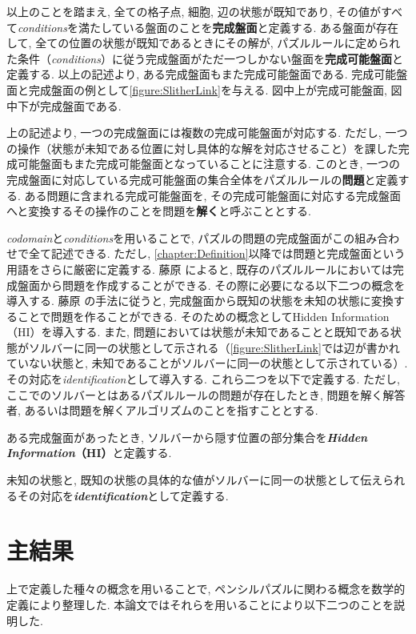 以上のことを踏まえ, 全ての格子点, 細胞, 辺の状態が既知であり, その値がすべて\textit{conditions}を満たしている盤面のことを\textbf{完成盤面}と定義する. ある盤面が存在して, 全ての位置の状態が既知であるときにその解が, パズルルールに定められた条件（\textit{conditions}）に従う完成盤面がただ一つしかない盤面を\textbf{完成可能盤面}と定義する. 以上の記述より, ある完成盤面もまた完成可能盤面である. 完成可能盤面と完成盤面の例として\cref{figure:SlitherLink}を与える. 図中上が完成可能盤面, 図中下が完成盤面である.

上の記述より, 一つの完成盤面には複数の完成可能盤面が対応する. ただし, 一つの操作（状態が未知である位置に対し具体的な解を対応させること）を課した完成可能盤面もまた完成可能盤面となっていることに注意する. このとき, 一つの完成盤面に対応している完成可能盤面の集合全体をパズルルールの\textbf{問題}と定義する. ある問題に含まれる完成可能盤面を, その完成可能盤面に対応する完成盤面へと変換するその操作のことを問題を\textbf{解く}と呼ぶこととする.

\textit{codomain}と\textit{conditions}を用いることで, パズルの問題の完成盤面がこの組み合わせで全て記述できる. ただし, \cref{chapter:Definition}以降では問題と完成盤面という用語をさらに厳密に定義する. 藤原 \cite{Fujiwara2022}によると, 既存のパズルルールにおいては完成盤面から問題を作成することができる. その際に必要になる以下二つの概念を導入する. 藤原 \cite{Fujiwara2022}の手法に従うと, 完成盤面から既知の状態を未知の状態に変換することで問題を作ることができる. そのための概念としてHidden Information（HI）を導入する. また, 問題においては状態が未知であることと既知である状態がソルバーに同一の状態として示される（\cref{figure:SlitherLink}では辺が書かれていない状態と, 未知であることがソルバーに同一の状態として示されている）. その対応を\textit{identification}として導入する. これら二つを以下で定義する. ただし, ここでのソルバーとはあるパズルルールの問題が存在したとき, 問題を解く解答者, あるいは問題を解くアルゴリズムのことを指すこととする.
\begin{definition}
  ある完成盤面があったとき, ソルバーから隠す位置の部分集合を\textbf{\textit{Hidden Information}（HI）}と定義する.
\end{definition}
\begin{definition}
  未知の状態と, 既知の状態の具体的な値がソルバーに同一の状態として伝えられるその対応を\textbf{\textit{identification}}として定義する.
\end{definition}

\section{主結果}
上で定義した種々の概念を用いることで, ペンシルパズルに関わる概念を数学的定義により整理した. 本論文ではそれらを用いることにより以下二つのことを説明した.
